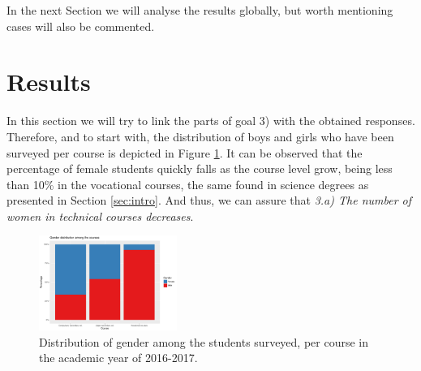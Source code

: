\documentclass[journal,transmag]{IEEEtran}
\begin{document}
In the next Section we will analyse the results globally, but worth mentioning cases will also be commented.

\section{Results}
\label{sec:results}

In this section we will try to link the parts of goal 3) with the obtained responses. Therefore, and to start with, the distribution of boys and girls who have been surveyed per course is depicted in Figure \ref{fig:alumni}. It can be observed that the percentage of female students quickly falls as the course level grow, being less than 10\% in the vocational courses, the same found in science degrees as presented in Section \ref{sec:intro}. And thus, we can assure that \textit{3.a) The number of women in technical courses decreases}.

\begin{figure}
  \centering
  \includegraphics[width=0.4\textwidth]{img/gender_distribution.pdf}
  \caption{Distribution of gender among the students surveyed, per course in the academic year of 2016-2017.}
  \label{fig:alumni}
\end{figure}

%
\end{document}
